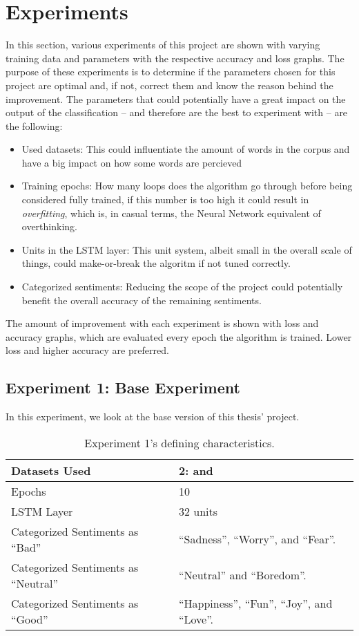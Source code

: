 \section{Experiments}
In this section, various experiments of this project are shown with varying training data and parameters with the respective accuracy and loss graphs.
The purpose of these experiments is to determine if the parameters chosen for this project are optimal and, if not, correct them and know the reason behind the improvement.
The parameters that could potentially have a great impact on the output of the classification -- and therefore are the best to experiment with -- are the following:
\begin{itemize}
	\item Used datasets: This could influentiate the amount of words in the corpus and have a big impact on how some words are percieved
	\item Training epochs: How many loops does the algorithm go through before being considered fully trained, if this number is too high it could result in \textit{overfitting}, which is, in casual terms, the Neural Network equivalent of overthinking.
	\item Units in the LSTM layer: This unit system, albeit small in the overall scale of things, could make-or-break the algoritm if not tuned correctly.
	\item Categorized sentiments: Reducing the scope of the project could potentially benefit the overall accuracy of the remaining sentiments.
\end{itemize}
The amount of improvement with each experiment is shown with loss and accuracy graphs, which are evaluated every epoch the algorithm is trained. Lower loss and higher accuracy are preferred.
\subsection{Experiment 1: Base Experiment}
\label{exp1}
In this experiment, we look at the base version of this thesis' project.
\begin{table}[!th]
	\caption{Experiment 1's defining characteristics.}
	\vspace{0.5cm}
	\centering
	\begin{tabular}[t]{|l|l|}
	\hline
		Datasets Used & 2: \citet{d1} and \citet{d2}
	\\ \hline
		Epochs & 10
	\\ \hline
		LSTM Layer & 32 units
	\\ \hline
		Categorized Sentiments as ``Bad'' & ``Sadness'', ``Worry'', and ``Fear''.
	\\ \hline	
		 Categorized Sentiments as ``Neutral'' & ``Neutral'' and ``Boredom''.
	\\ \hline	
		Categorized Sentiments as ``Good'' & ``Happiness'', ``Fun'', ``Joy'', and ``Love''.
	\\ \hline
	\end{tabular}
\end{table}

